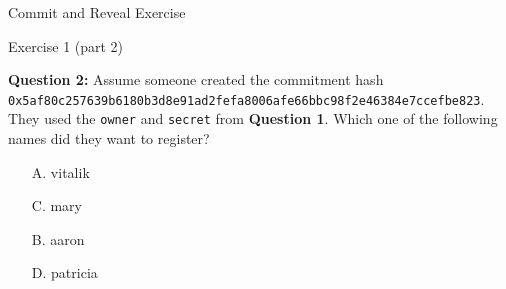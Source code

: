 \documentclass[handout]{beamer}
\begin{document}
\begin{frame}{Commit and Reveal Exercise}

	\begin{exercise}{Exercise 1 (part 2)}
	
		\textbf{Question 2:} Assume someone created the commitment hash \texttt{0x5af80c257639b6180b3d8e91ad2fefa8006afe66bbc98f2e46384e7ccefbe823}. They used the \texttt{owner} and \texttt{secret} from \textbf{Question 1}. Which one of the following names did they want to register?
			
		\vspace{-0.5em}
		\begin{multicols}{2}
				\begin{itemize}
					\item[A.] vitalik
					\item[C.] mary
					\item[B.] aaron
					\item[D.] patricia
				\end{itemize}
			\end{multicols}
		
	\end{exercise}
	
\end{frame}
\end{document}
